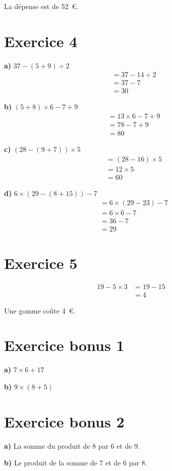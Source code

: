 \documentclass[12pt]{extarticle}
\begin{document}
La dépense est de 52~€.

\section*{Exercice 4}

\textbf{a)} $37 - (5 + 9) \div 2$
\begin{align*}
&= 37 - 14 \div 2 \\
&= 37 - 7 \\
&= 30
\end{align*}

\textbf{b)} $(5 + 8) \times 6 - 7 + 9$
\begin{align*}
&= 13 \times 6 - 7 + 9 \\
&= 78 - 7 + 9 \\
&= 80
\end{align*}

\textbf{c)} $(28 - (9 + 7)) \times 5$
\begin{align*}
&= (28 - 16) \times 5 \\
&= 12 \times 5 \\
&= 60
\end{align*}

\textbf{d)} $6 \times (29 - (8 + 15)) - 7$
\begin{align*}
&= 6 \times (29 - 23) - 7 \\
&= 6 \times 6 - 7 \\
&= 36 - 7 \\
&= 29
\end{align*}

\section*{Exercice 5}
\begin{align*}
19 - 5 \times 3 &= 19 - 15 \\
                &= 4
\end{align*}

Une gomme coûte 4~€.

\section*{Exercice bonus 1}

\textbf{a)} $7 \times 6 + 17$

\textbf{b)} $9 \times (8 + 5)$

\section*{Exercice bonus 2}

\textbf{a)} La somme du produit de 8 par 6 et de 9.

\textbf{b)} Le produit de la somme de 7 et de 6 par 8.
\end{document}
